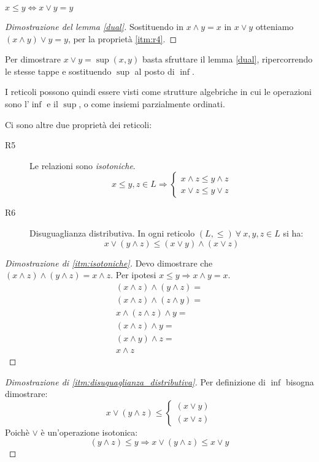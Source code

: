 \begin{lem}\label{dual}
$ x \le y \Leftrightarrow x \vee y = y $
\end{lem}
\begin{proof}[Dimostrazione del lemma \ref{dual}]
Sostituendo in $x \wedge y = x$ in $ x \vee y $ otteniamo $ (x \wedge y) \vee y = y $, per la propriet\`a \ref{itm:r4}.
\end{proof}
Per dimostrare $x \vee y = \sup(x,y)$ basta sfruttare il lemma \ref{dual}, ripercorrendo le stesse tappe e sostituendo $\sup$ al posto di $\inf$.

I reticoli possono quindi essere visti come strutture algebriche in cui le operazioni sono l'$\inf$ e il $\sup$, o come insiemi parzialmente ordinati.

Ci sono altre due propriet\`a dei reticoli:
\begin{description}
  \item [R5\label{itm:isotoniche}] Le relazioni sono \textit{isotoniche}.
  \[
  x \le y, z \in L \Rightarrow 
  \begin{cases}
  x \wedge z \le y \wedge z \\ 
  x \vee z \le y \vee z
  \end{cases}
  \]
  \item [R6\label{itm:disuguaglianza_distributiva}] Disuguaglianza distributiva. In ogni reticolo $(L, \le) \ \forall \ x, y, z \in L $ si ha:
  \[
  x \vee (y \wedge z) \le (x \vee y) \wedge (x \vee z)
  \]
\end{description}

\begin{proof}[Dimostrazione di \ref{itm:isotoniche}]
Devo dimostrare che $ (x \wedge z) \wedge (y \wedge z) = x \wedge z $.
Per ipotesi $x \le y \Rightarrow x \wedge y = x$.
\begin{multline*}
(x \wedge z) \wedge (y \wedge z) = \\
(x \wedge z) \wedge (z \wedge y) = \\
x \wedge (z \wedge z) \wedge y = \\
(x \wedge z) \wedge y = \\
(x \wedge y) \wedge z = \\
 x \wedge z
\end{multline*}
\end{proof}
\begin{proof}[Dimostrazione di \ref{itm:disuguaglianza_distributiva}]
Per definizione di $\inf$ bisogna dimostrare:
\[
x \vee (y \wedge z) \le 
\begin{cases}
(x \vee y) \\
(x \vee z)
\end{cases}
\]
Poich\`e $\vee$ \`e un'operazione isotonica:
\[
(y \wedge z) \le y \Rightarrow x \vee (y \wedge z) \le x \vee y
\]
\end{proof}

